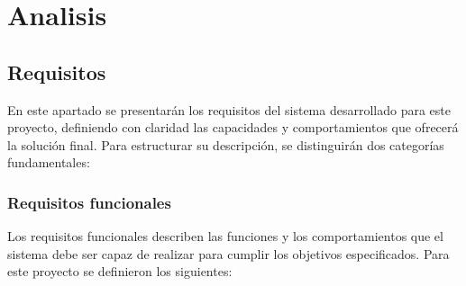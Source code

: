 \chapter{Analisis}
\label{chap:analisis}

\section{Requisitos}
\label{sec:requisitos}

En este apartado se presentarán los requisitos del sistema desarrollado para este proyecto, definiendo con 
claridad las capacidades y comportamientos que ofrecerá la solución final. Para estructurar su descripción, 
se distinguirán dos categorías fundamentales:

\subsection{Requisitos funcionales}
\label{sec:req_no_funcionales}

Los requisitos funcionales describen las funciones y los comportamientos que el sistema debe ser capaz de realizar 
para cumplir los objetivos especificados. 
Para este proyecto se definieron los siguientes:


